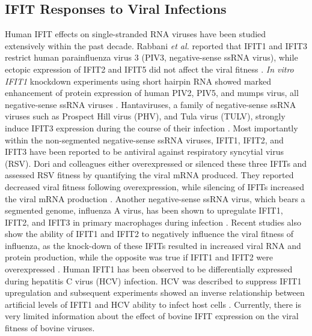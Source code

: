 \subsection{IFIT Responses to Viral Infections} \label{subsec:IFIT Responses to Viral Infections}
Human IFIT effects on single-stranded RNA viruses have been studied extensively within the past decade. Rabbani \textit{et al.} reported that IFIT1 and IFIT3 restrict human parainfluenza virus 3 (PIV3, negative-sense ssRNA virus), while ectopic expression of IFIT2 and IFIT5 did not affect the viral fitness \cite{Rabbani2016Identification3}. \textit{In vitro} \textit{IFIT1} knockdown experiments using short hairpin RNA showed marked enhancement of protein expression of human PIV2, PIV5, and mumps virus, all negative-sense ssRNA viruses \cite{Andrejeva2013ISG56/IFIT1Synthesis, Young2016HumanFamily}. Hantaviruses, a family of negative-sense ssRNA viruses such as Prospect Hill virus (PHV), and Tula virus (TULV), strongly induce IFIT3 expression during the course of their infection \cite{Matthys2011TheInduction}. Most importantly within the non-segmented negative-sense ssRNA viruses, IFIT1, IFIT2, and IFIT3 have been reported to be antiviral against respiratory syncytial virus (RSV). Dori and colleagues either overexpressed or silenced these three IFITs and assessed RSV fitness by quantifying the viral mRNA produced. They reported decreased viral fitness following overexpression, while silencing of IFITs increased the viral mRNA production   . Another negative-sense ssRNA virus, which bears a segmented genome, influenza A virus, has been shown to upregulate IFIT1, IFIT2, and IFIT3 in primary macrophages during infection \cite{Lietzen2011QuantitativeMacrophages}. Recent studies also show the ability of IFIT1 and IFIT2 to negatively influence the viral fitness of influenza, as the knock-down of these IFITs resulted in increased viral RNA and protein production, while the opposite was true if IFIT1 and IFIT2 were overexpressed \cite{Zhu2023TheSynthesis}. Human IFIT1 has been observed to be differentially expressed during hepatitis C virus (HCV) infection. HCV was described to suppress IFIT1 upregulation and subsequent experiments showed an inverse relationship between artificial levels of IFIT1 and HCV ability to infect host cells \cite{Raychoudhuri2011ISG56Replication, Ishida2019HepaticInfection}. Currently, there is very limited information about the effect of bovine IFIT expression on the viral fitness of bovine viruses.


